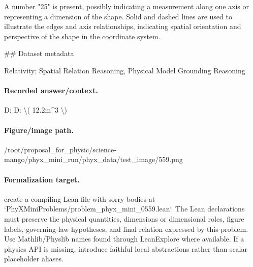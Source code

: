 A number "25" is present, possibly indicating a measurement along one axis or representing a dimension of the shape. Solid and dashed lines are used to illustrate the edges and axis relationships, indicating spatial orientation and perspective of the shape in the coordinate system.

\#\# Dataset metadata

Relativity; Spatial Relation Reasoning, Physical Model Grounding Reasoning

\paragraph{Recorded answer/context.}
D: D: \textbackslash{}( 12.2m\textasciicircum{}3 \textbackslash{})

\paragraph{Figure/image path.}
/root/proposal\_for\_physic/science-mango/phyx\_mini\_run/phyx\_data/test\_image/559.png

\paragraph{Formalization target.}
create a compiling Lean file with sorry bodies at `PhyXMiniProblems/problem\_phyx\_mini\_0559.lean`. The Lean declarations must preserve the physical quantities, dimensions or dimensional roles, figure labels, governing-law hypotheses, and final relation expressed by this problem.
Use Mathlib/Physlib names found through LeanExplore where available. If a physics API is missing, introduce faithful local abstractions rather than scalar placeholder aliases.

